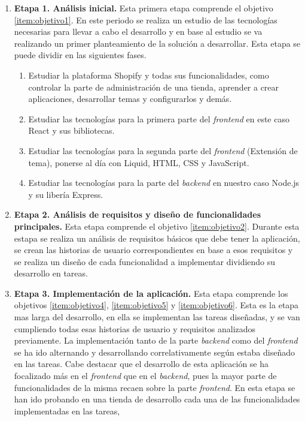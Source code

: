 \documentclass[11pt]{article}
\begin{document}
\begin{enumerate}[label={\textbf{\textbullet}}]
    \item \textbf{Etapa 1. Análisis inicial.} Esta primera etapa comprende el objetivo \ref{item:objetivo1}. En este periodo se realiza un estudio de las tecnologías
    necesarias para llevar a cabo el desarrollo y en base al estudio se va realizando un primer planteamiento de la solución a desarrollar. Esta etapa se puede dividir en las siguientes fases.
    \begin{enumerate}
        \item Estudiar la plataforma Shopify y todas sus funcionalidades, como controlar la parte de administración de una tienda, aprender a crear aplicaciones, desarrollar temas y configurarlos y demás.
        \item Estudiar las tecnologías para la primera parte del \textit{frontend} en este caso React y sus bibliotecas.
        \item Estudiar las tecnologías para la segunda parte del \textit{frontend} (Extensión de tema), ponerse al día con Liquid, HTML, CSS y JavaScript.
        \item Estudiar las tecnologías para la parte del \textit{backend} en nuestro caso Node.js y su libería Express. 
    \end{enumerate}
    \item \textbf{Etapa 2. Análisis de requisitos y diseño de funcionalidades principales.} Esta etapa comprende el objetivo \ref{item:objetivo2}.
    Durante esta estapa se realiza un análisis de requisitos básicos que debe tener la aplicación, se crean las historias de usuario correspondientes en base a esos requisitos y se realiza un diseño de cada
    funcionalidad a implementar dividiendo su desarrollo en tareas.
    \item \textbf{Etapa 3. Implementación de la aplicación.} Esta etapa comprende los objetivos \ref{item:objetivo4}, \ref{item:objetivo5} y \ref{item:objetivo6}.
    Esta es la etapa mas larga del desarrollo, en ella se implementan las tareas diseñadas, y se van cumpliendo todas esas historias de usuario y requisitos analizados previamente.
    La implementación tanto de la parte \textit{backend} como del \textit{frontend} se ha ido alternando y desarrollando correlativamente según estaba diseñado en las tareas. Cabe destacar que el desarrollo de esta aplicación se ha focalizado
    más en el \textit{frontend} que en el \textit{backend}, pues la mayor parte de funcionalidades de la misma recaen sobre la parte \textit{frontend}. En esta etapa se han ido probando en una tienda de desarrollo cada una de las funcionalidades implementadas en las tareas, 

\end{enumerate}
\end{document}
